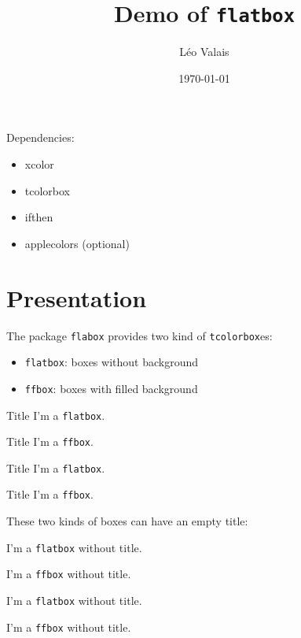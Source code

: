 \documentclass[a4paper]{article}
\title{Demo of \texttt{flatbox}}
\author{Léo Valais}
\date\today
\begin{document}
\maketitle

Dependencies:
\begin{itemize}
\item xcolor
\item tcolorbox
\item ifthen
\item applecolors (optional)
\end{itemize}

\section{Presentation}
The package \texttt{flabox} provides two kind of \texttt{tcolorbox}es:

\begin{itemize}
\item \texttt{flatbox}: boxes without background
\item \texttt{ffbox}: boxes with filled background
\end{itemize}

\begin{flatbox}{Title}
  I'm a \texttt{flatbox}.
\end{flatbox}

\begin{ffbox}{Title}
  I'm a \texttt{ffbox}.
\end{ffbox}

\begin{latexcode}
\begin{flatbox}{Title}
  I'm a \texttt{flatbox}.
\end{flatbox}

\begin{ffbox}{Title}
  I'm a \texttt{ffbox}.
\end{ffbox}
\end{latexcode}

These two kinds of boxes can have an empty title:

\begin{flatbox}{}
  I'm a \texttt{flatbox} without title.
\end{flatbox}

\begin{ffbox}{}
  I'm a \texttt{ffbox} without title.
\end{ffbox}

\begin{latexcode}
\begin{flatbox}{}
  I'm a \texttt{flatbox} without title.
\end{flatbox}

\begin{ffbox}{}
  I'm a \texttt{ffbox} without title.
\end{ffbox}
\end{latexcode}
\end{document}
